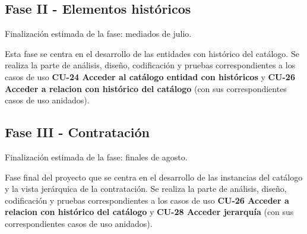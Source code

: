 \subsection{Fase II - Elementos históricos}
Finalización estimada de la fase: mediados de julio.

Esta fase se centra en el desarrollo de las entidades con histórico del catálogo. Se realiza la parte de análisis, diseño, codificación y pruebas correspondientes a los casos de uso \textbf{CU-24 Acceder al catálogo entidad con históricos} y \textbf{CU-26 Acceder a relacion con histórico del catálogo} (con sus correspondientes casos de uso anidados).


\subsection{Fase III - Contratación}
Finalización estimada de la fase: finales de agosto.

Fase final del proyecto que se centra en el desarrollo de las instancias del catálogo y la vista jerárquica de la contratación. Se realiza la parte de análisis, diseño, codificación y pruebas correspondientes a los casos de uso \textbf{CU-26 Acceder a relacion con histórico del catálogo} y \textbf{CU-28 Acceder jerarquía} (con sus correspondientes casos de uso anidados). 



